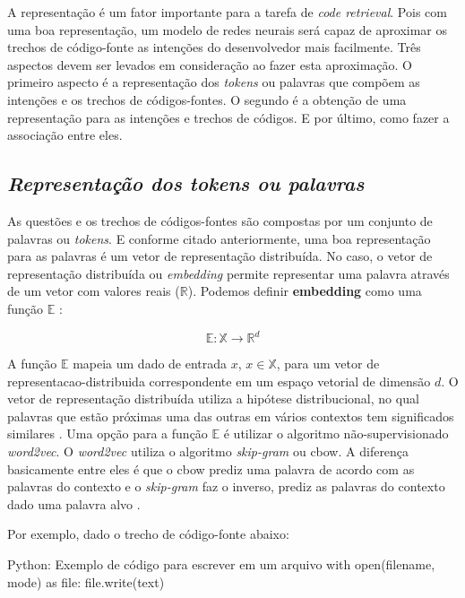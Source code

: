 A representação é um fator importante para a tarefa de \textit{code retrieval}. Pois com uma boa representação, um modelo de redes neurais será capaz de aproximar os trechos de código-fonte as intenções do desenvolvedor mais facilmente. Três aspectos devem ser levados em consideração ao fazer esta aproximação. O primeiro aspecto é a representação dos \textit{tokens} ou palavras que compõem as intenções e os trechos de códigos-fontes. O segundo é a obtenção de uma representação para as intenções e trechos de códigos. E por último, como fazer a associação entre eles.

\subsection{\textit{Representação dos \textit{tokens} ou palavras}}
\label{sec:fundamentao-representacao-tokens-palavras}

As questões e os trechos de códigos-fontes são compostas por um conjunto de palavras ou \textit{tokens}. E conforme citado anteriormente, uma boa representação para as palavras é um vetor de representação distribuída. No caso, o vetor de representação distribuída ou \textit{embedding} permite representar uma palavra através de um vetor com valores reais ($\mathbb{R}$). Podemos definir \textbf{embedding} como uma função $\mathbb{E}$ \citep{cambronero-deep-learning-code-search:2019}:

\begin{equation}
    \mathbb{E}: \mathbb{X} \rightarrow \mathbb{R}^{d}
\end{equation}

A função $\mathbb{E}$ mapeia um dado de entrada $x$, $x \in \mathbb{X}$, para um vetor de \gls{representacao-distribuida} correspondente em um espaço vetorial de dimensão $d$. O vetor de representação distribuída utiliza a hipótese distribucional, no qual palavras que estão próximas uma das outras em vários contextos tem significados similares \citep{Goodfellow-et-al-2016}. Uma opção para a função $\mathbb{E}$ é utilizar o algoritmo não-supervisionado \textit{word2vec}. O \textit{word2vec} utiliza o algoritmo \textit{skip-gram} ou \acrshort{cbow}. A diferença basicamente entre eles é que o \acrshort{cbow} prediz uma palavra de acordo com as palavras do contexto e o \textit{skip-gram} faz o inverso, prediz as palavras do contexto dado uma palavra alvo \citep{mikolov2013distributed}.

Por exemplo, dado o trecho de código-fonte abaixo:

\begin{mypython}{Python: Exemplo de código para escrever em um arquivo}
with open(filename, mode) as file:
    file.write(text)
\end{mypython}

